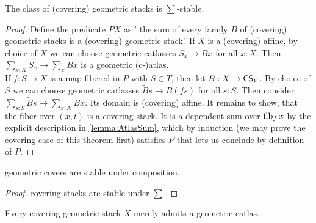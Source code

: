 \begin{theorem}{\label{thm:CSSum}}
	The class of (covering) geometric stacks is $\sum$-stable.
\end{theorem}
\begin{proof}

	Define the predicate $P X$ as ' the sum of every family $B$ of (covering) geometric stacks is a (covering) geometric stack'.
	If $X$ is a (covering) affine, by choice of $X$ we can choose geometric catlasses $S_x \to B x$ for all $x : X$. Then $\sum_{x :X } S_x \to \sum_x B x$ is a geometric (c-)atlas. \\
	If $f : S \to X$ is a map fibered in $P$ with $S \in T$, then let $B : X \to \mathsf{CS}_{\mathcal{V}}$. By choice of $S$ we can choose geometric catlasses $\tilde B s \to B (f s)$ for all $s : S$. Then consider $\sum_{s : S} \tilde B s \to \sum_{x : X} B x$. Its domain is (covering) affine. It remains to show, that the fiber over $(x,t)$ is a covering stack. It is a dependent sum over $\operatorname{fib}_f x$ by the explicit description in \ref{lemma:AtlasSum}, which by induction (we may prove the covering case of this theorem first) satisfies $P$ that lets us conclude by definition of $P$.
\end{proof}
\begin{lemma}{\label{lemma:coversstableundercomp}}
	geometric covers are stable under composition.
\end{lemma}
\begin{proof}
	covering stacks are stable under $\sum$.
\end{proof}

\begin{prop}{\label{prop:csHasAtlas}}
	Every covering geometric stack $X$ merely admits a geometric catlas. %
\end{prop}

